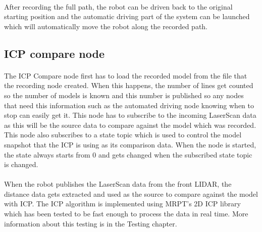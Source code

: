 \paragraph{}
After recording the full path, the robot can be driven back to the original starting position and the automatic driving part of the system can be launched which will automatically move the robot along the recorded path.


\subsection{ICP compare node}
\paragraph{}
The ICP Compare node first has to load the recorded model from the file that the recording node created. When this happens, the number of lines get counted so the number of models is known and this number is published so any nodes that need this information such as the automated driving node knowing when to stop can easily get it. This node has to subscribe to the incoming LaserScan data as this will be the source data to compare against the model which was recorded. This node also subscribes to a state topic which is used to control the model snapshot that the ICP is using as its comparison data. When the node is started, the state always starts from 0 and gets changed when the subscribed state topic is changed.
\paragraph{}
When the robot publishes the LaserScan data from the front LIDAR, the distance data gets extracted and used as the source to compare against the model with ICP. The ICP algorithm is implemented using MRPT's 2D ICP library which has been tested to be fast enough to process the data in real time. More information about this testing is in the Testing chapter.
